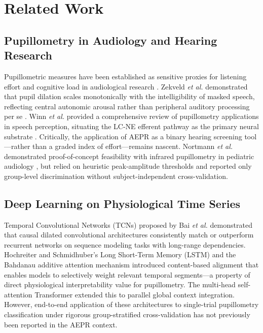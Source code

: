 \documentclass[journal]{IEEEtran}
\begin{document}
\section{Related Work}

\subsection{Pupillometry in Audiology and Hearing Research}
Pupillometric measures have been established as sensitive proxies for listening effort and cognitive load in audiological research \cite{kramer2013pupillometry, koelewijn2012pupil, zekveld2010pupil}. Zekveld \textit{et al.} demonstrated that pupil dilation scales monotonically with the intelligibility of masked speech, reflecting central autonomic arousal rather than peripheral auditory processing per se \cite{zekveld2010pupil}. Winn \textit{et al.} provided a comprehensive review of pupillometry applications in speech perception, situating the LC-NE efferent pathway as the primary neural substrate \cite{winn2018pupillometry}. Critically, the application of AEPR as a binary hearing screening tool—rather than a graded index of effort—remains nascent. Nortmann \textit{et al.} demonstrated proof-of-concept feasibility with infrared pupillometry in pediatric audiology \cite{nortmann2020screening}, but relied on heuristic peak-amplitude thresholds and reported only group-level discrimination without subject-independent cross-validation.

\subsection{Deep Learning on Physiological Time Series}
Temporal Convolutional Networks (TCNs) proposed by Bai \textit{et al.} \cite{bai2018empirical} demonstrated that causal dilated convolutional architectures consistently match or outperform recurrent networks on sequence modeling tasks with long-range dependencies. Hochreiter and Schmidhuber's Long Short-Term Memory (LSTM) \cite{hochreiter1997long} and the Bahdanau additive attention mechanism \cite{bahdanau2015neural} introduced content-based alignment that enables models to selectively weight relevant temporal segments—a property of direct physiological interpretability value for pupillometry. The multi-head self-attention Transformer \cite{vaswani2017attention} extended this to parallel global context integration. However, end-to-end application of these architectures to single-trial pupillometry classification under rigorous group-stratified cross-validation has not previously been reported in the AEPR context.
\end{document}
